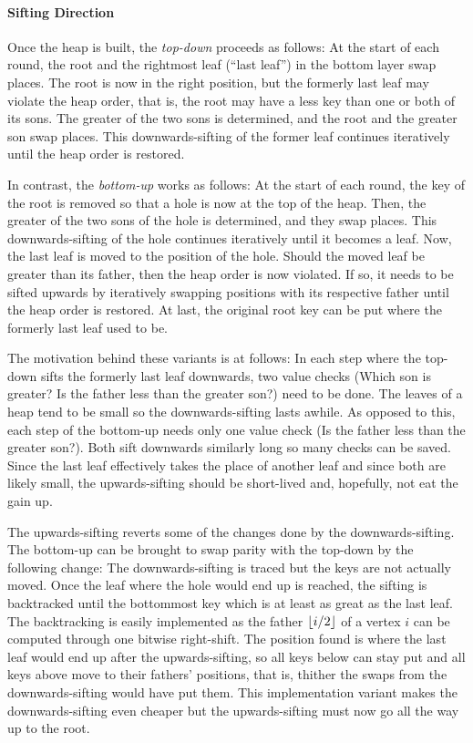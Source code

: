 \paragraph{Sifting Direction}
Once the heap is built, the \emph{top-down} \HS{} proceeds as follows:
At the start of each round, the root and the rightmost leaf (\enquote{last leaf}) in the bottom layer swap places.
The root is now in the right position, but the formerly last leaf may violate the heap order, that is, the root may have a less key than one or both of its sons.
The greater of the two sons is determined, and the root and the greater son swap places.
This downwards-sifting of the former leaf continues iteratively until the heap order is restored.

In contrast, the \emph{bottom-up} \HS{} \cite{wegener1993heapsort} works as follows:
At the start of each round, the key of the root is removed so that a hole is now at the top of the heap.
Then, the greater of the two sons of the hole is determined, and they swap places.
This downwards-sifting of the hole continues iteratively until it becomes a leaf.
Now, the last leaf is moved to the position of the hole.
Should the moved leaf be greater than its father, then the heap order is now violated.
If so, it needs to be sifted upwards by iteratively swapping positions with its respective father until the heap order is restored.
At last, the original root key can be put where the formerly last leaf used to be.

The motivation behind these variants is at follows:
In each step where the top-down \HS{} sifts the formerly last leaf downwards, two value checks (Which son is greater? Is the father less than the greater son?) need to be done.
The leaves of a heap tend to be small so the downwards-sifting lasts awhile.
As opposed to this, each step of the bottom-up \HS{} needs only one value check (Is the father less than the greater son?).
Both \HS*{} sift downwards similarly long so many checks can be saved.
Since the last leaf effectively takes the place of another leaf and since both are likely small, the upwards-sifting should be short-lived and, hopefully, not eat the gain up.

The upwards-sifting reverts some of the changes done by the downwards-sifting.
The bottom-up \HS{} can be brought to swap parity with the top-down \HS{} by the following change:
The downwards-sifting is traced but the keys are not actually moved.
Once the leaf where the hole would end up is reached, the sifting is backtracked until the bottommost key which is at least as great as the last leaf.
The backtracking is easily implemented as the father \(\lfloor i/2\rfloor\) of a vertex \(i\) can be computed through one bitwise right-shift.
The position found is where the last leaf would end up after the upwards-sifting, so all keys below can stay put and all keys above move to their fathers' positions, that is, thither the swaps from the downwards-sifting would have put them.
This implementation variant makes the downwards-sifting even cheaper but the upwards-sifting must now go all the way up to the root.


